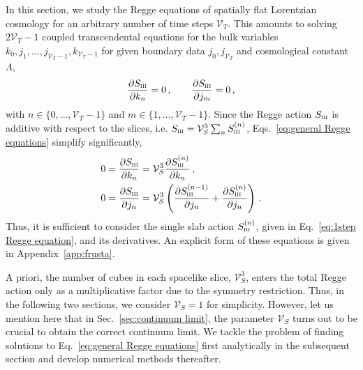 \documentclass[amsmath,amssymb,aps,twocolumn,superscriptaddress,nofootinbib]{revtex4-1}
\begin{document}
In this section, we study the Regge equations of spatially flat Lorentzian cosmology for an arbitrary number of time steps $\mathcal{V}_T$. 
This amounts to solving $2\mathcal{V}_T-1$ coupled transcendental equations for the bulk variables $k_0,j_1,\dots,j_{\mathcal{V}_T-1},k_{\mathcal{V}_T-1}$ for given boundary data $j_0, j_{\mathcal{V}_T}$ and cosmological constant $\Lambda$,
%
\begin{equation}\label{eq:general Regge equations}
\pdv{S_{\textsc{iii}}}{k_n} = 0\,,\qquad \pdv{S_{\textsc{iii}}}{j_m} = 0\,,
\end{equation}
%
with $n\in\{0,\dots,\mathcal{V}_T-1\}$ and $m\in\{1,\dots,\mathcal{V}_T-1\}$. Since the Regge action $S_\textsc{iii}$ is additive with respect to the slices, i.e. $S_\textsc{iii} = \mathcal{V}_S^3\sum_n S_\textsc{iii}^{(n)}$, Eqs.~\eqref{eq:general Regge equations} simplify significantly,
%
\begin{equation}
\begin{aligned}
0 &= \pdv{S_\textsc{iii}}{k_n} = \mathcal{V}_S^3\pdv{S_\textsc{iii}^{(n)}}{k_n} \,,\\
0 &= \pdv{S_\textsc{iii}}{j_n} = \mathcal{V}_S^3\left(\pdv{S_\textsc{iii}^{(n-1)}}{j_n} + \pdv{S_\textsc{iii}^{(n)}}{j_n}\right)\,.
\end{aligned}
\end{equation}
%
Thus, it is sufficient to consider the single slab action $S^{(n)}_\textsc{iii}$, given in Eq.~\eqref{eq:1step Regge equation}, and its derivatives. An explicit form of these equations is given in Appendix~\ref{app:frusta}. 

A priori, the number of cubes in each spacelike slice, $\mathcal{V}_S^3$, enters the total Regge action only as a multiplicative factor due to the symmetry restriction.
Thus, in the following two sections, we consider $\mathcal{V}_S = 1$ for simplicity.
However, let us mention here that in Sec.~\ref{sec:continuum limit}, the parameter $\mathcal{V}_S$ turns out to be crucial to obtain the correct continuum limit. 
We tackle the problem of finding solutions to Eq.~\eqref{eq:general Regge equations} first analytically in the subsequent section and develop numerical methods thereafter.

\end{document}
